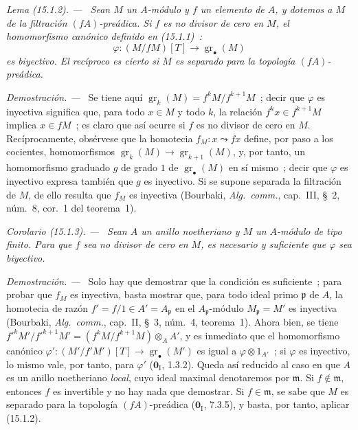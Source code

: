 \documentclass[10pt,oneside]{book}
\makeatletter
\newcommand{\gr}{\operatorname{gr}}
\newcommand{\setmanualcurrentlabel}[1]{\def\@currentlabel{#1}}
\newenvironment{corollary}[1][]{%
  \setmanualcurrentlabel{#1}\par\medskip\noindent\itshape Corolario (#1). ---\ }{\par}
\newenvironment{lemma}[1][]{%
  \setmanualcurrentlabel{#1}\par\medskip\noindent\itshape Lema (#1). ---\ }{\par}
\newenvironment{proof}{%
  \par\medskip\noindent\textit{Demostración. ---\ }}{\par}
\makeatother
\begin{document}
\begin{lemma}[15.1.2]
\label{0.15.1.2-es}
Sean $M$ un $A$-módulo y $f$ un elemento de $A$, y dotemos a $M$ de la
filtración $(fA)$-preádica. Si $f$ es no divisor de cero en $M$,
el homomorfismo canónico definido en (15.1.1)~:
\[
  \varphi:(M/fM)[T]\longrightarrow\gr_\bullet(M)
  \tag{15.1.2.1}\label{0.15.1.2.1-es}
\]
es biyectivo. El recíproco es cierto si $M$ es separado para la topología
$(fA)$-preádica.
\end{lemma}

\begin{proof}
Se tiene aquí $\gr_k(M)=f^kM/f^{k+1}M$~; decir que $\varphi$ es inyectiva
significa que, para todo $x\in M$ y todo $k$, la relación
$f^kx\in f^{k+1}M$ implica $x\in fM$~; es claro que así ocurre si $f$ es no
divisor de cero en $M$. Recíprocamente, obsérvese que la homotecia
$f_M:x\leadsto fx$ define, por paso a los cocientes, homomorfismos
$\gr_k(M)\to\gr_{k+1}(M)$, y, por tanto, un homomorfismo graduado $g$ de grado
$1$ de $\gr_\bullet(M)$ en sí mismo~; decir que $\varphi$ es inyectivo expresa
también que $g$ es inyectivo. Si se supone separada la filtración de $M$, de
ello resulta que $f_M$ es inyectiva (Bourbaki, \emph{Alg.~comm.}, cap.~III,
\S~2, núm.~8, cor.~1 del teorema~1).
\end{proof}

\begin{corollary}[15.1.3]
\label{0.15.1.3-es}
Sean $A$ un anillo noetheriano y $M$ un $A$-módulo de tipo finito. Para que
$f$ sea no divisor de cero en $M$, es necesario y suficiente que $\varphi$ sea
biyectivo.
\end{corollary}

\begin{proof}
Solo hay que demostrar que la condición es suficiente~; para probar que $f_M$
es inyectiva, basta mostrar que, para todo ideal primo $\mathfrak p$ de $A$,
la homotecia de razón $f'=f/1\in A'=A_{\mathfrak p}$ en el
$A_{\mathfrak p}$-módulo $M_{\mathfrak p}=M'$ es inyectiva (Bourbaki,
\emph{Alg.~comm.}, cap.~II, \S~3, núm.~4, teorema~1). Ahora bien, se tiene
$f'^kM'/f'^{k+1}M'=(f^kM/f^{k+1}M)\otimes_A A'$, y es inmediato que
el homomorfismo canónico $\varphi':(M'/f'M')[T]\to\gr_\bullet(M')$ es igual a
$\varphi\otimes 1_{A'}$~; si $\varphi$ es inyectivo, lo mismo vale, por tanto,
para $\varphi'$ ($\mathbf{0}_{\mathrm I}$, 1.3.2). Queda así reducido al caso en que $A$
es un anillo noetheriano \emph{local}, cuyo ideal maximal denotaremos por
$\mathfrak m$. Si $f\notin\mathfrak m$, entonces $f$ es invertible y no hay
nada que demostrar. Si $f\in\mathfrak m$, se sabe que $M$ es separado para la
topología $(fA)$-preádica ($\mathbf{0}_{\mathrm I}$, 7.3.5), y basta, por tanto,
aplicar (15.1.2).
\end{proof}
\end{document}
